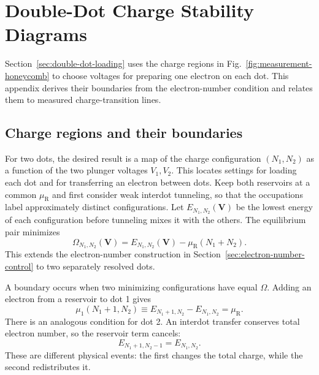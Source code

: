 \FloatBarrier
\section{Double-Dot Charge Stability Diagrams}
\label{app:charge-stability}
\label{sec:charge-stability-measurements}

Section~\ref{sec:double-dot-loading} uses the charge regions in
Fig.~\ref{fig:measurement-honeycomb} to choose voltages for preparing
one electron on each dot. This appendix derives their boundaries
from the electron-number condition and relates them to measured
charge-transition lines.

\subsection{Charge regions and their boundaries}
\label{sec:measurement-double-dot-csd}

For two dots, the desired result is a map of the charge configuration
$(N_1,N_2)$ as a function of the two plunger voltages $V_1,V_2$.
This locates settings for loading each dot and for transferring an
electron between dots. Keep both reservoirs at a common
$\mu_{\mathrm R}$ and first consider weak interdot tunneling, so
that the occupations label approximately distinct configurations.
Let $E_{N_1,N_2}(\mathbf V)$ be the lowest energy of each
configuration before tunneling mixes it with the others. The
equilibrium pair minimizes
\begin{equation}
 \Omega_{N_1,N_2}(\mathbf V)
       =E_{N_1,N_2}(\mathbf V)-\mu_{\mathrm R}(N_1+N_2).
 \label{eq:measurement-double-dot-grand-energy}
\end{equation}
This extends the electron-number construction in Section~\ref{sec:electron-number-control}
to two separately resolved dots.

A boundary occurs when two minimizing configurations have equal
$\Omega$. Adding an electron from a reservoir to dot 1 gives
\begin{equation}
 \mu_1(N_1+1,N_2)\equiv
 E_{N_1+1,N_2}-E_{N_1,N_2}=\mu_{\mathrm R}.
 \label{eq:measurement-dot1-boundary}
\end{equation}
There is an analogous condition for dot 2. An interdot transfer
conserves total electron number, so the reservoir term cancels:
\begin{equation}
 E_{N_1+1,N_2-1}=E_{N_1,N_2}.
 \label{eq:measurement-interdot-boundary}
\end{equation}
These are different physical events: the first changes the total
charge, while the second redistributes it.

